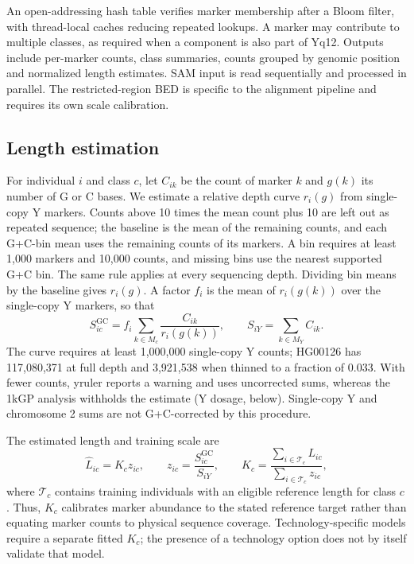 \documentclass[pdflatex,sn-nature]{sn-jnl}
\begin{document}
An open-addressing hash table verifies marker membership after a Bloom filter, with thread-local caches reducing repeated lookups. A marker may contribute to multiple classes, as required when a component is also part of Yq12. Outputs include per-marker counts, class summaries, counts grouped by genomic position and normalized length estimates. SAM input is read sequentially and processed in parallel. The restricted-region BED is specific to the alignment pipeline and requires its own scale calibration.

\subsection{Length estimation}\label{sec:m-length}
For individual $i$ and class $c$, let $C_{ik}$ be the count of marker $k$ and $g(k)$ its number of G or C bases. We estimate a relative depth curve $r_i(g)$ from single-copy Y markers. Counts above 10 times the mean count plus 10 are left out as repeated sequence; the baseline is the mean of the remaining counts, and each G+C-bin mean uses the remaining counts of its markers. A bin requires at least 1,000 markers and 10,000 counts, and missing bins use the nearest supported G+C bin. The same rule applies at every sequencing depth. Dividing bin means by the baseline gives $r_i(g)$. A factor $f_i$ is the mean of $r_i(g(k))$ over the single-copy Y markers, so that
\begin{equation}
 S^{\mathrm{GC}}_{ic}=f_i\sum_{k\in M_c}\frac{C_{ik}}{r_i(g(k))},
 \qquad S_{iY}=\sum_{k\in M_Y}C_{ik}.
\end{equation}
The curve requires at least 1,000,000 single-copy Y counts; HG00126 has 117,080,371 at full depth and 3,921,538 when thinned to a fraction of 0.033. With fewer counts, yruler reports a warning and uses uncorrected sums, whereas the 1kGP analysis withholds the estimate (Y dosage, below). Single-copy Y and chromosome 2 sums are not G+C-corrected by this procedure.

The estimated length and training scale are
\begin{equation}
 \widehat L_{ic}=K_c z_{ic},\qquad
 z_{ic}=\frac{S^{\mathrm{GC}}_{ic}}{S_{iY}},\qquad
 K_c=\frac{\sum_{i\in\mathcal T_c}L_{ic}}
 {\sum_{i\in\mathcal T_c}z_{ic}},
\end{equation}
where $\mathcal T_c$ contains training individuals with an eligible reference length for class $c$. Thus, $K_c$ calibrates marker abundance to the stated reference target rather than equating marker counts to physical sequence coverage. Technology-specific models require a separate fitted $K_c$; the presence of a technology option does not by itself validate that model.
\end{document}
